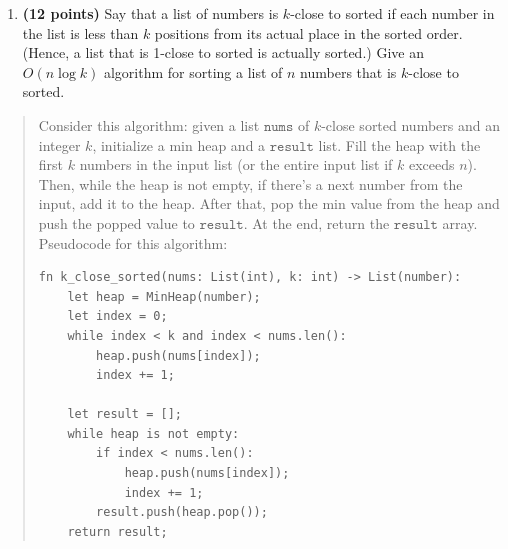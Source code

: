 \documentclass[11pt]{article}
\newcommand{\code}[1]{$\texttt{#1}$}
\begin{document}
\begin{enumerate}
\begin{enumerate}
\begin{quote}
\end{quote}
    \item {\bf (12 points)}
Say that a list of numbers is $k$-close to
sorted if each number in the list is less than $k$ positions from its
actual place in the sorted order.  (Hence, a list that is 1-close to
sorted is actually sorted.)  Give an $O(n \log k)$ algorithm for
sorting a list of $n$ numbers that is $k$-close to sorted.
\end{enumerate}
\begin{quote}
  \color{purple}
  Consider this algorithm: given a list \code{nums} of $k$-close sorted numbers and an integer $k$, initialize a min heap and a \code{result} list. Fill the heap with the first $k$ numbers in the input list (or the entire input list if $k$ exceeds $n$). Then, while the heap is not empty, if there's a next number from the input, add it to the heap. After that, pop the min value from the heap and push the popped value to \code{result}. At the end, return the \code{result} array. Pseudocode for this algorithm: 
  \newpage
  \begin{verbatim}
fn k_close_sorted(nums: List(int), k: int) -> List(number):
    let heap = MinHeap(number);
    let index = 0;
    while index < k and index < nums.len():
        heap.push(nums[index]);
        index += 1;

    let result = [];
    while heap is not empty:
        if index < nums.len():
            heap.push(nums[index]);
            index += 1;
        result.push(heap.pop());
    return result;
  \end{verbatim}


\end{quote}
\end{enumerate}
\end{document}
